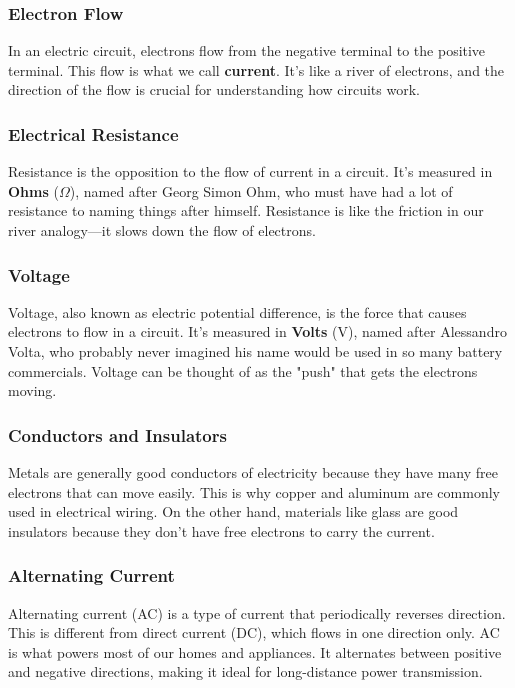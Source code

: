 \subsubsection*{Electron Flow}
In an electric circuit, electrons flow from the negative terminal to the positive terminal. This flow is what we call \textbf{current}. It's like a river of electrons, and the direction of the flow is crucial for understanding how circuits work. 

\subsubsection*{Electrical Resistance}
Resistance is the opposition to the flow of current in a circuit. It's measured in \textbf{Ohms} (\(\Omega\)), named after Georg Simon Ohm, who must have had a lot of resistance to naming things after himself. Resistance is like the friction in our river analogy—it slows down the flow of electrons.

\subsubsection*{Voltage}
Voltage, also known as electric potential difference, is the force that causes electrons to flow in a circuit. It's measured in \textbf{Volts} (V), named after Alessandro Volta, who probably never imagined his name would be used in so many battery commercials. Voltage can be thought of as the "push" that gets the electrons moving.

\subsubsection*{Conductors and Insulators}
Metals are generally good conductors of electricity because they have many free electrons that can move easily. This is why copper and aluminum are commonly used in electrical wiring. On the other hand, materials like glass are good insulators because they don't have free electrons to carry the current. 

\subsubsection*{Alternating Current}
Alternating current (AC) is a type of current that periodically reverses direction. This is different from direct current (DC), which flows in one direction only. AC is what powers most of our homes and appliances. It alternates between positive and negative directions, making it ideal for long-distance power transmission.

